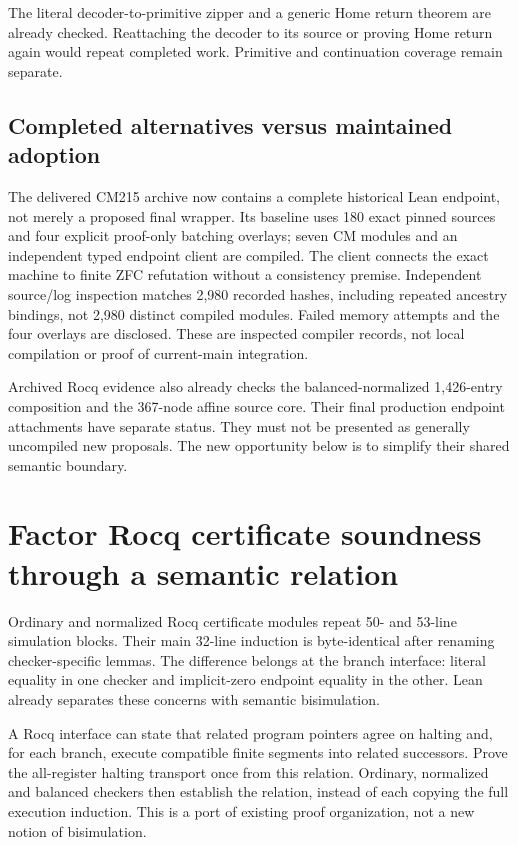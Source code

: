 \documentclass[11pt]{article}
\begin{document}
The literal decoder-to-primitive zipper and a generic Home return theorem are already checked. Reattaching the decoder to its source or proving Home return again would repeat completed work. Primitive and continuation coverage remain separate.

\subsection{Completed alternatives versus maintained adoption}
The delivered CM215 archive now contains a complete historical Lean endpoint, not merely a proposed final wrapper. Its baseline uses 180 exact pinned sources and four explicit proof-only batching overlays; seven CM modules and an independent typed endpoint client are compiled. The client connects the exact machine to finite ZFC refutation without a consistency premise. Independent source/log inspection matches 2,980 recorded hashes, including repeated ancestry bindings, not 2,980 distinct compiled modules. Failed memory attempts and the four overlays are disclosed. These are inspected compiler records, not local compilation or proof of current-main integration.

Archived Rocq evidence also already checks the balanced-normalized 1,426-entry composition and the 367-node affine source core. Their final production endpoint attachments have separate status. They must not be presented as generally uncompiled new proposals. The new opportunity below is to simplify their shared semantic boundary.

\section{Factor Rocq certificate soundness through a semantic relation}
Ordinary and normalized Rocq certificate modules repeat 50- and 53-line simulation blocks. Their main 32-line induction is byte-identical after renaming checker-specific lemmas. The difference belongs at the branch interface: literal equality in one checker and implicit-zero endpoint equality in the other. Lean already separates these concerns with semantic bisimulation.

A Rocq interface can state that related program pointers agree on halting and, for each branch, execute compatible finite segments into related successors. Prove the all-register halting transport once from this relation. Ordinary, normalized and balanced checkers then establish the relation, instead of each copying the full execution induction. This is a port of existing proof organization, not a new notion of bisimulation.
\end{document}
